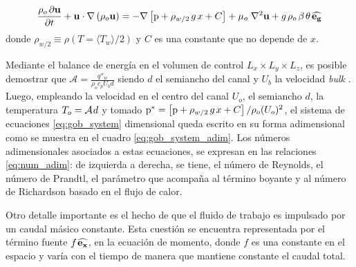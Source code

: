 \begin{equation}
\frac{ \rho_o \hspace{0.5mm} \partial \mathbf{u}}{\partial t} + \mathbf{u} \cdot \nabla  \left( \rho_o \mathbf{u} \right) = -\nabla \left[ \text{p} + \rho_{w/2} \hspace{0.5mm} g \hspace{0.5mm} x + C \right] + \mu_o \hspace{1mm} {\nabla}^2 \mathbf{u}  + g \hspace{0.5mm} \rho_o \hspace{0.5mm} \beta \hspace{0.5mm} \theta \hspace{0.5mm} \mathbf{\widehat{e_g}}
\label{eq:mom_rewrite}  
\end{equation}
donde $\rho_{w/2} \equiv \rho(T=\langle T_w \rangle / 2)$ y $C$ es una constante que no depende de $x$. 

Mediante el balance de energía en el volumen de control $L_x \times L_y \times L_z$, es posible demostrar que $\mathcal{A} = \frac{q''_w}{\rho_o  c_p U_b d}$ siendo $d$ el semiancho del canal y $U_b$ la velocidad \textit{bulk} \cite{pope2001turbulent}. Luego, empleando la velocidad en el centro del canal $U_o$, el semiancho $d$, la temperatura $T_o = \mathcal{A} \hspace{0.3mm} d $ y tomado $\text{p}^* = \left[ \text{p} + \rho_{w/2} \hspace{0.5mm} g \hspace{0.5mm} x + C \right] / \rho_o (U_o)^2$, el sistema de ecuaciones \ref{eq:gob_system} dimensional queda escrito en su forma adimensional como se muestra en el cuadro \ref{eq:gob_system_adim}. Los números adimensionales asociados a estas ecuaciones, se expresan en las relaciones \ref{eq:num_adim}: de izquierda a derecha, se tiene, el número de Reynolds, el número de Prandtl, el parámetro que acompaña al término boyante y al número de Richardson basado en el flujo de calor. 

Otro detalle importante es el hecho de que el fluido de trabajo es impulsado por un caudal másico constante. Esta cuestión se encuentra representada por el término fuente $f \hspace{0.3mm} \mathbf{\widehat{e_x}}$, en la ecuación de momento, donde $f$ es una constante en el espacio y varía con el tiempo de manera que mantiene constante el caudal total. 

